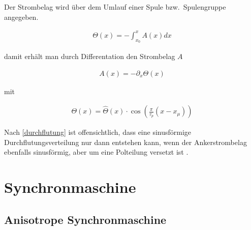Der Strombelag wird über dem Umlauf einer Spule bzw.\ Spulengruppe angegeben.

\begin{align}
\Theta(x) = - \int_{x_0}^{x} A(x)dx \label{durchflutung}
\end{align}

damit erhält man durch Differentation den Strombelag $A$

\begin{align}
A(x) = -\partial_x \Theta(x) \label{Strombelag}
\end{align}

mit

\begin{align}
\Theta(x) = \hat{\Theta}(x)\cdot \cos(\frac{\pi}{\tau_p}(x-x_\mu)) \label{adurchflutung}
\end{align}

Nach \ref{durchflutung} ist offensichtlich, dass eine sinusförmige Durchflutungsverteilung nur dann entstehen kann, wenn der Ankerstrombelag ebenfalls sinusförmig, aber um eine Polteilung versetzt ist \parencite[S.~247]{mullerI2005}.


\section{Synchronmaschine}\label{sec:synchron}



\subsection{Anisotrope Synchronmaschine}\label{sec:anisosynchron}



